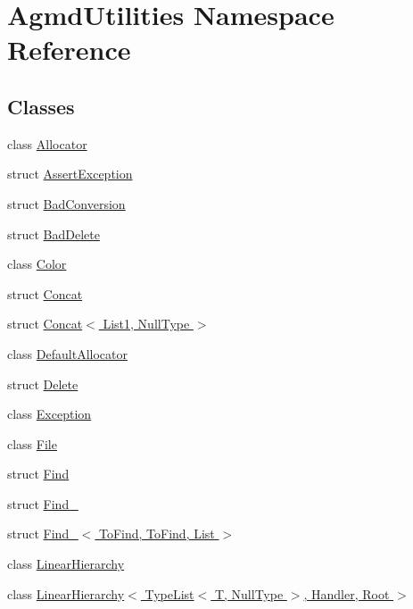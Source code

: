 \hypertarget{namespace_agmd_utilities}{\section{Agmd\+Utilities Namespace Reference}
\label{namespace_agmd_utilities}
}
\subsection*{Classes}
\begin{DoxyCompactItemize}
\item 
class \hyperlink{class_agmd_utilities_1_1_allocator}{Allocator}
\item 
struct \hyperlink{struct_agmd_utilities_1_1_assert_exception}{Assert\+Exception}
\item 
struct \hyperlink{struct_agmd_utilities_1_1_bad_conversion}{Bad\+Conversion}
\item 
struct \hyperlink{struct_agmd_utilities_1_1_bad_delete}{Bad\+Delete}
\item 
class \hyperlink{class_agmd_utilities_1_1_color}{Color}
\item 
struct \hyperlink{struct_agmd_utilities_1_1_concat}{Concat}
\item 
struct \hyperlink{struct_agmd_utilities_1_1_concat_3_01_list1_00_01_null_type_01_4}{Concat$<$ List1, Null\+Type $>$}
\item 
class \hyperlink{class_agmd_utilities_1_1_default_allocator}{Default\+Allocator}
\item 
struct \hyperlink{struct_agmd_utilities_1_1_delete}{Delete}
\item 
class \hyperlink{class_agmd_utilities_1_1_exception}{Exception}
\item 
class \hyperlink{class_agmd_utilities_1_1_file}{File}
\item 
struct \hyperlink{struct_agmd_utilities_1_1_find}{Find}
\item 
struct \hyperlink{struct_agmd_utilities_1_1_find__}{Find\+\_\+}
\item 
struct \hyperlink{struct_agmd_utilities_1_1_find___3_01_to_find_00_01_to_find_00_01_list_01_4}{Find\+\_\+$<$ To\+Find, To\+Find, List $>$}
\item 
class \hyperlink{class_agmd_utilities_1_1_linear_hierarchy}{Linear\+Hierarchy}
\item 
class \hyperlink{class_agmd_utilities_1_1_linear_hierarchy_3_01_type_list_3_01_t_00_01_null_type_01_4_00_01_handler_00_01_root_01_4}{Linear\+Hierarchy$<$ Type\+List$<$ T, Null\+Type $>$, Handler, Root $>$}

\end{DoxyCompactItemize}

